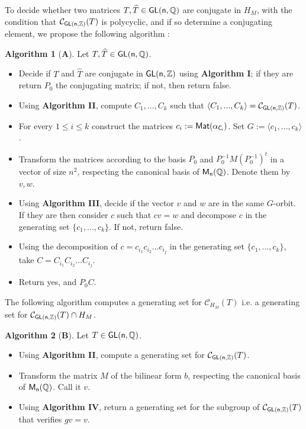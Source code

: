 \documentclass[a4paper,11pt]{article}
\theoremstyle{definition}
\newtheorem*{algorithm}{Algorithm}
\newcommand{\Z}{\mathbb Z}
\newcommand{\Q}{\mathbb Q}
\newcommand{\C}{\mathcal C}
\def \GL{\sf{GL}}
\newcommand{\M}{\sf{M}}
\newcommand{\Mat}{\sf{Mat}}
\begin{document}
To decide whether two matrices  $T,\widehat{T} \in \GL(n,\Q)$ are conjugate in $H_M$, with the condition that $\C_{\GL(n,\Z)}(T)$ is polycyclic, and if so determine a conjugating element, we propose the following algorithm :
\begin{algorithm}[\textbf{A}]\label{A}
Let $T, \widehat{T} \in \GL(n,\Q) $.
\begin{itemize}
    \item Decide if $T$ and $\widehat{T}$ are conjugate in $\GL(n, \Z)$ using \textbf{Algorithm I}; if they are return $P_0$ the conjugating matrix; if not, then return false.
    \item Using  \textbf{Algorithm II}, compute $C_1,...,C_k $ such that $\langle C_1,...,C_k\rangle= \C_{\GL(n,\Z)}(T)$.
    \item For every $1 \le i \le k$ construct the matrices $c_i:=\Mat(\alpha_{C_i})$. Set $G:= \langle c_1,...,c_k\rangle$.
    \item Transform the matrices according to the basis  $P_0$ and $P_0^{-1}M(P_0^{-1})^t$ in a vector of size $n^2$, respecting the canonical basis of $\M_n(\Q)$. Denote them by $v,w$.
    \item Using \textbf{Algorithm III}, decide if the vector $v$ and $w$ are in the same $G$-orbit. If they are then consider $c$ such that $cv=w$ and decompose $c$ in the generating set $\{c_1,...,c_k\}$. If not, return false.
    \item Using the decomposition of $c=c_{i_1}c_{i_2}...c_{i_j}$ in the generating set $\{c_1,...,c_k\}$, take  $C =C_{i_1}C_{i_2}...C_{i_j}$. 
    \item Return yes, and $P_0C$.
    
    
\end{itemize}





    
\end{algorithm}
The following algorithm computes a generating set for $\C_{H_M}(T)$ i.e. a generating set for $\C_{\GL(n,\Z)}(T)\cap H_M $.
\begin{algorithm}[\textbf{B}]
 Let $T\in \GL(n,\Q)$. 
\begin{itemize}
    \item Using \textbf{Algorithm II}, compute a generating set for $\C_{\GL(n,\Z)}(T) $.
    \item Transform the matrix $M$ of the bilinear form $b$, respecting the canonical basis of $\M_n(\Q)$. Call it $v$.
    \item Using \textbf{Algorithm IV}, return a generating set for the subgroup of $\C_{\GL(n,\Z)}(T)$ that verifies $gv=v$.
\end{itemize}
 
\end{algorithm}
\end{document}
